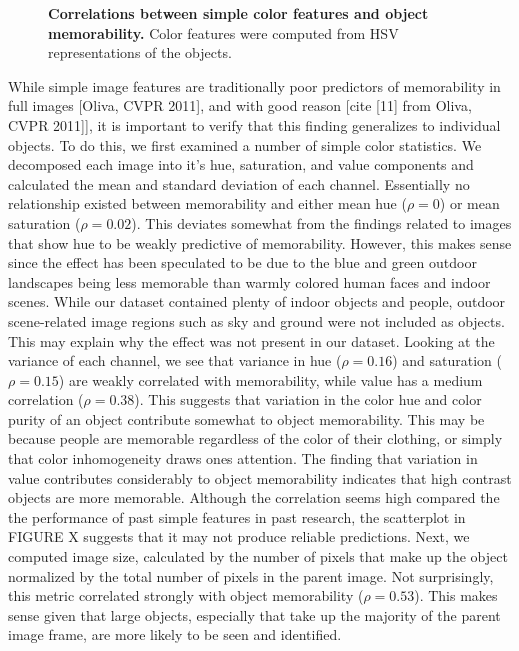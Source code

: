 \begin{figure}[t]
\centering
{}
\vspace{-5mm}\caption{\footnotesize\textbf{Correlations between simple color features and object memorability.} Color features were computed from HSV representations of the objects. }\label{fig:simple}
\end{figure}

While simple image features are traditionally poor predictors of memorability in full images [Oliva, CVPR 2011], and with good reason [cite [11] from Oliva, CVPR 2011]], it is important to verify that this finding generalizes to individual objects. To do this, we first examined a number of simple color statistics. We decomposed each image into it's hue, saturation, and value components and calculated the mean and standard deviation of each channel. Essentially no relationship existed between memorability and either mean hue ($\rho = 0$) or mean saturation ($\rho = 0.02$). This deviates somewhat from the findings related to images that show hue to be weakly predictive of memorability. However, this makes sense since the effect has been speculated to be due to the blue and green outdoor landscapes being less memorable than warmly colored human faces and indoor scenes. While our dataset contained plenty of indoor objects and people, outdoor scene-related image regions such as sky and ground were not included as objects. This may explain why the effect was not present in our dataset. Looking at the variance of each channel, we see that variance in hue ($\rho = 0.16$) and saturation ($\rho = 0.15$) are weakly correlated with memorability, while value has a medium correlation ($\rho = 0.38$). This suggests that variation in the color hue and color purity of an object contribute somewhat to object memorability. This may be because people are memorable regardless of the color of their clothing, or simply that color inhomogeneity draws ones attention. The finding that variation in value contributes considerably to object memorability indicates that high contrast objects are more memorable. Although the correlation seems high compared the the performance of past simple features in past research, the scatterplot in FIGURE X suggests that it may not produce reliable predictions. Next, we computed image size, calculated by the number of pixels that make up the object normalized by the total number of pixels in the parent image. Not surprisingly, this metric correlated strongly with object memorability ($\rho = 0.53$). This makes sense given that large objects, especially that take up the majority of the parent image frame, are more likely to be seen and identified. 